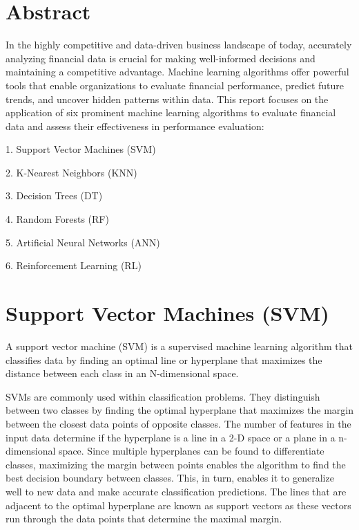 \documentclass[12pt,a4paper]{report}
\begin{document}

\chapter*{Abstract}
\begin{spacing}{1.5}
 In the highly competitive and data-driven business landscape of today, accurately analyzing financial data is crucial for making well-informed decisions and maintaining a competitive advantage. Machine learning algorithms offer powerful tools that enable organizations to evaluate financial performance, predict future trends, and uncover hidden patterns within data. This report focuses on the application of six prominent machine learning algorithms to evaluate financial data and assess their effectiveness in performance evaluation:

1. Support Vector Machines (SVM)\par
2. K-Nearest Neighbors (KNN)\par
3. Decision Trees (DT)\par
4. Random Forests (RF)\par
5. Artificial Neural Networks (ANN)\par
6. Reinforcement Learning (RL)\par
\end{spacing}
\clearpage






\tableofcontents

\clearpage




\chapter{Support Vector Machines (SVM)}
A support vector machine (SVM) is a supervised machine learning algorithm that classifies data by finding an optimal line or hyperplane that maximizes the distance between each class in an N-dimensional space.

SVMs are commonly used within classification problems. They distinguish between two classes by finding the optimal hyperplane that maximizes the margin between the closest data points of opposite classes. The number of features in the input data determine if the hyperplane is a line in a 2-D space or a plane in a n-dimensional space. Since multiple hyperplanes can be found to differentiate classes, maximizing the margin between points enables the algorithm to find the best decision boundary between classes. This, in turn, enables it to generalize well to new data and make accurate classification predictions. The lines that are adjacent to the optimal hyperplane are known as support vectors as these vectors run through the data points that determine the maximal margin.
\end{document}

